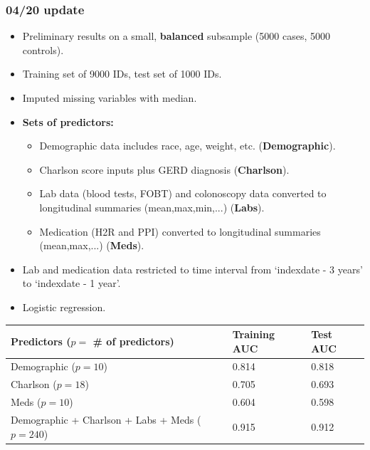 \documentclass[12pt]{article}
\begin{document}
\pagebreak

\subsubsection*{04/20 update}

\begin{itemize}
  \item Preliminary results on a small, {\bf balanced} subsample (5000 cases, 5000 controls).
  \item Training set of 9000 IDs, test set of 1000 IDs.
  \item Imputed missing variables with median.
  \item {\bf Sets of predictors:}
  \begin{itemize}
    \item Demographic data includes race, age, weight, etc. ({\bf Demographic}).
    \item Charlson score inputs plus GERD diagnosis ({\bf Charlson}).
    \item Lab data (blood tests, FOBT) and colonoscopy data converted to longitudinal summaries (mean,max,min,...) ({\bf Labs}).
    \item Medication (H2R and PPI) converted to longitudinal summaries (mean,max,...) ({\bf Meds}).
  \end{itemize}
  \item Lab and medication data restricted to time interval from `indexdate - 3 years' to `indexdate - 1 year'.
  \item Logistic regression.
\end{itemize}

\begin{center}
\begin{table}[h!!]
\begin{tabular}{|l|l|l|}
\hline
\textbf{Predictors ($p=$ \# of predictors)}                                                & \textbf{Training AUC} & \textbf{Test AUC} \\ \hline
Demographic ($p=10$)                                     & 0.814                 & 0.818             \\ \hline
Charlson ($p=18$) & 0.705 & 0.693                                                            \\ \hline
Meds ($p=10$)                                                 & 0.604              & 0.598       \\ \hline
Demographic + Charlson + Labs + Meds ($p=240$)                                                 & 0.915                & 0.912            \\ \hline
\end{tabular}
\end{table}
\end{center}
\end{document}
